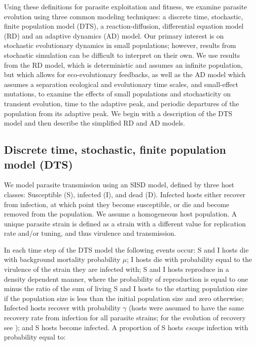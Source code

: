 Using these definitions for parasite exploitation and fitness, we examine parasite evolution using three common modeling techniques: a discrete time, stochastic, finite population model (DTS), a reaction-diffusion, differential equation model (RD) and an adaptive dynamics (AD) model. Our primary interest is on stochastic evolutionary dynamics in small populations; however, results from stochastic simulation can be difficult to interpret on their own. We use results from the RD model, which is deterministic and assumes an infinite population, but which allows for eco-evolutionary feedbacks, as well as the AD model which assumes a separation ecological and evolutionary time scales, and small-effect mutations, to examine the effects of small populations and stochasticity on transient evolution, time to the adaptive peak, and periodic departures of the population from its adaptive peak. We begin with a description of the DTS model and then describe the simplified RD and AD models.

\subsection*{Discrete time, stochastic, finite population model (DTS)}

We model parasite transmission using an SISD model, defined by three host classes: Susceptible (S), infected (I), and dead (D). Infected hosts either recover from infection, at which point they become susceptible, or die and become removed from the population. We assume a homogeneous host population. A unique parasite strain is defined as a strain with a different value for replication rate and/or tuning, and thus virulence and transmission.

In each time step of the DTS model the following events occur: S and I hosts die with background mortality probability $\mu$; I hosts die with probability equal to the virulence of the strain they are infected with; S and I hosts reproduce in a density dependent manner, where the probability of reproduction is equal to one minus the ratio of the sum of living S and I hosts to the starting population size if the population size is less than the initial population size and zero otherwise; Infected hosts recover with probability $\gamma$ (hosts were assumed to have the same recovery rate from infection for all parasite strains; for the evolution of recovery see \citealt{AndersonandMay1982, AlizonandvanBaalen2005}); and S hosts become infected. A proportion of S hosts \emph{escape} infection with probability equal to:

